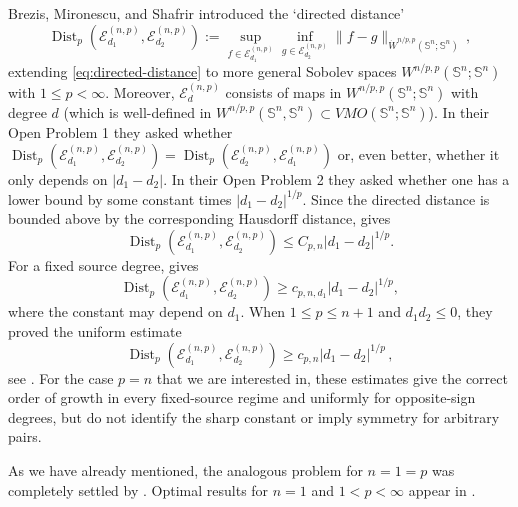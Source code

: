 \documentclass[11pt,reqno]{amsart}
\numberwithin{equation}{section}
\newcommand{\Sph}{\mathbb S}
\newcommand{\E}{\mathcal E}
\newcommand{\distdir}{\operatorname{Dist}}
\begin{document}
Brezis, Mironescu, and Shafrir \cite{BrezisMironescuShafrir2016} introduced the `directed distance' 
\begin{equation}
    \label{eq:directeddistgen}
    \distdir_{p}(\E_{d_1}^{(n,p)},\E_{d_2}^{(n,p)}) := \sup_{f\in\E_{d_1}^{(n,p)}}
    \inf_{g\in\E_{d_2}^{(n,p)}} \| f - g \|_{\dot W^{n/p,p}(\Sph^n;\Sph^n)} \,,
\end{equation}
extending \eqref{eq:directed-distance} to more general Sobolev spaces $W^{n/p,p}(\Sph^n;\Sph^n)$ with $1\leq p<\infty$. Moreover, $\E_d^{(n,p)}$ consists of maps in $W^{n/p,p}(\Sph^n;\Sph^n)$ with degree $d$ (which is well-defined in $W^{n/p,p}(\Sph^n,\Sph^n)\subset VMO(\Sph^n;\Sph^n)$). In their Open Problem 1 they asked whether $\distdir_{p}(\E_{d_1}^{(n,p)},\E_{d_2}^{(n,p)}) = \distdir_{p}(\E_{d_2}^{(n,p)},\E_{d_1}^{(n,p)})$ or, even better, whether it only depends on $|d_1-d_2|$. In their Open Problem 2 they asked whether one has a lower bound by some constant times $|d_1-d_2|^{1/p}$. Since the directed distance is bounded above by the corresponding Hausdorff distance, \cite[Theorem~1.7(1)]{BrezisMironescuShafrir2016} gives
\begin{equation}\label{eq:BMS-upper}
  \distdir_{p}(\E_{d_1}^{(n,p)},\E_{d_2}^{(n,p)})
  \le C_{p,n}|d_1-d_2|^{1/p}.
\end{equation}
For a fixed source degree, \cite[Proposition~7.8]{BrezisMironescuShafrir2016} gives
\begin{equation}\label{eq:BMS-fixed-source}
  \distdir_{p}(\E_{d_1}^{(n,p)},\E_{d_2}^{(n,p)})
  \ge c_{p,n,d_1}|d_1-d_2|^{1/p},
\end{equation}
where the constant may depend on $d_1$. When $1\le p\le n+1$ and $d_1d_2\le0$, they proved the uniform estimate
\begin{equation}\label{eq:BMS-opposite-sign}
  \distdir_{p}(\E_{d_1}^{(n,p)},\E_{d_2}^{(n,p)})
  \ge c_{p,n}|d_1-d_2|^{1/p} \,,
\end{equation}
see \cite[Proposition~7.5]{BrezisMironescuShafrir2016}.  For the case $p=n$ that we are interested in, these estimates give the correct order of growth in every fixed-source regime and uniformly for opposite-sign degrees, but do not identify the sharp constant or imply symmetry for arbitrary pairs.

As we have already mentioned, the analogous problem for $n=1=p$ was completely settled by \cite[Theorem~1.4(1)]{BrezisMironescuShafrir2016}. Optimal results for $n=1$ and $1<p<\infty$ appear in \cite[Theorem~1.1 and Corollary~1.2]{Shafrir2018}.
\end{document}
